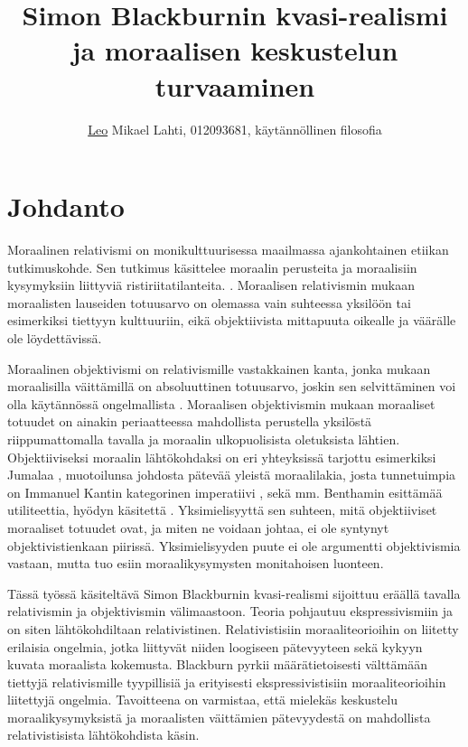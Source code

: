 \documentclass[a4paper,12pt,times,titlepage,finnish]{article}
\title{Simon Blackburnin kvasi-realismi ja moraalisen keskustelun turvaaminen}
\author{\underline{Leo} Mikael Lahti, 012093681, käytännöllinen filosofia}
\date{Kandidaatin tutkielma  \date{}}
\begin{document}

\maketitle
\thispagestyle{empty}
\tableofcontents
\newpage

\setcounter{page}{1}



\section*{Johdanto}

Moraalinen relativismi on monikulttuurisessa maailmassa ajankohtainen etiikan tutkimuskohde. Sen tutkimus kä\-sit\-te\-lee moraalin perusteita ja moraalisiin kysymyksiin liittyviä ristiriitatilanteita. \citep[ks. esim.][luku 2]{Boghossian06,relativismSE,LaFollette00}. Moraalisen relativismin mukaan moraalisten lauseiden totuusarvo on olemassa vain suhteessa yksilöön tai esimerkiksi tiettyyn kulttuuriin, eikä objektiivista mittapuuta oikealle ja väärälle ole löy\-det\-tä\-vis\-sä. 

Moraalinen objektivismi on relativismille vastakkainen kanta, jonka mukaan moraalisilla väittämillä on absoluuttinen totuusarvo, joskin sen selvittäminen voi olla käytännössä ongelmallista \citep[ks. esim.][luku 2]{LaFollette00}.  Moraalisen objektivismin mukaan moraaliset totuudet on ainakin periaatteessa mahdollista perustella yksilöstä riippumattomalla tavalla ja moraalin ulkopuolisista oletuksista lähtien. Objektiiviseksi moraalin lähtökohdaksi on eri yhteyksissä tarjottu esimerkiksi Jumalaa \citep[ks.][]{Rentto02}, muotoilunsa johdosta pätevää yleistä moraalilakia, josta tunnetuimpia on Immanuel Kantin kategorinen imperatiivi \citep{Kant1788}, sekä mm. Benthamin esittämää utiliteettia, hyödyn käsitettä \citep{Bentham1789}. Yksimielisyyttä sen suhteen, mitä objektiiviset moraaliset totuudet ovat, ja miten ne voidaan johtaa, ei ole syntynyt objektivistienkaan piirissä. Yksimielisyyden puute ei ole argumentti objektivismia vastaan, mutta tuo esiin moraalikysymysten monitahoisen luonteen. 

Tässä työssä käsiteltävä Simon Blackburnin kvasi-\-realismi sijoittuu eräällä tavalla relativismin ja objektivismin välimaastoon. Teoria pohjautuu ekspressivismiin ja on siten lähtökohdiltaan relativistinen. Relativistisiin moraaliteorioihin on liitetty erilaisia ongelmia, jotka liittyvät niiden loogiseen pätevyyteen sekä kykyyn kuvata moraalista kokemusta. Blackburn pyrkii määrätietoisesti välttämään tiettyjä relativismille tyypillisiä ja erityisesti ekspressivistisiin moraaliteorioihin liitettyjä ongelmia. Tavoitteena on varmistaa, että mielekäs keskustelu moraalikysymyksistä ja moraalisten väittämien pätevyydestä on mahdollista relativistisista lähtökohdista käsin.
\end{document}
